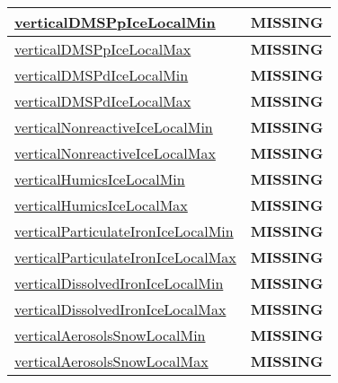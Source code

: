 {\begin{center}
\begin{longtable}{| p{2.0in} | p{4.0in} |}
    \hline
    \hyperref[subsec:var_sec_tracer_monotonicity_verticalDMSPpIceLocalMin]{verticalDMSPpIceLocalMin} & {\bf \color{red} MISSING} \\
    \hline
    \hyperref[subsec:var_sec_tracer_monotonicity_verticalDMSPpIceLocalMax]{verticalDMSPpIceLocalMax} & {\bf \color{red} MISSING} \\
    \hline
    \hyperref[subsec:var_sec_tracer_monotonicity_verticalDMSPdIceLocalMin]{verticalDMSPdIceLocalMin} & {\bf \color{red} MISSING} \\
    \hline
    \hyperref[subsec:var_sec_tracer_monotonicity_verticalDMSPdIceLocalMax]{verticalDMSPdIceLocalMax} & {\bf \color{red} MISSING} \\
    \hline
    \hyperref[subsec:var_sec_tracer_monotonicity_verticalNonreactiveIceLocalMin]{verticalNonreactiveIceLocalMin} & {\bf \color{red} MISSING} \\
    \hline
    \hyperref[subsec:var_sec_tracer_monotonicity_verticalNonreactiveIceLocalMax]{verticalNonreactiveIceLocalMax} & {\bf \color{red} MISSING} \\
    \hline
    \hyperref[subsec:var_sec_tracer_monotonicity_verticalHumicsIceLocalMin]{verticalHumicsIceLocalMin} & {\bf \color{red} MISSING} \\
    \hline
    \hyperref[subsec:var_sec_tracer_monotonicity_verticalHumicsIceLocalMax]{verticalHumicsIceLocalMax} & {\bf \color{red} MISSING} \\
    \hline
    \hyperref[subsec:var_sec_tracer_monotonicity_verticalParticulateIronIceLocalMin]{verticalParticulateIronIceLocal\-Min} & {\bf \color{red} MISSING} \\
    \hline
    \hyperref[subsec:var_sec_tracer_monotonicity_verticalParticulateIronIceLocalMax]{verticalParticulateIronIceLocal\-Max} & {\bf \color{red} MISSING} \\
    \hline
    \hyperref[subsec:var_sec_tracer_monotonicity_verticalDissolvedIronIceLocalMin]{verticalDissolvedIronIceLocalMin} & {\bf \color{red} MISSING} \\
    \hline
    \hyperref[subsec:var_sec_tracer_monotonicity_verticalDissolvedIronIceLocalMax]{verticalDissolvedIronIceLocalMax} & {\bf \color{red} MISSING} \\
    \hline
    \hyperref[subsec:var_sec_tracer_monotonicity_verticalAerosolsSnowLocalMin]{verticalAerosolsSnowLocalMin} & {\bf \color{red} MISSING} \\
    \hline
    \hyperref[subsec:var_sec_tracer_monotonicity_verticalAerosolsSnowLocalMax]{verticalAerosolsSnowLocalMax} & {\bf \color{red} MISSING} \\

\end{longtable}
\end{center}}
